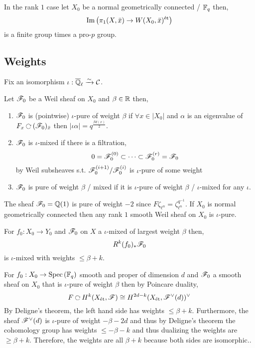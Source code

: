 \documentclass[12pt]{article}
\begin{document}
\begin{exercise}
In the rank $1$ case let $X_0$ be a normal geometrically connected / $\mathbb{F}_q$ then,
\[ \mathrm{Im}\left( \pi_1(X, \bar{x}) \to W(X_0, \bar{x})^{\text{\'{e}t}} \right) \]
is a finite group times a pro-$p$ group. 
\end{exercise}

\subsection{Weights}

Fix an isomorphism $\iota : \overline{\mathbb{Q}}_\ell \xrightarrow{\sim} \mathcal{C}$. 

\begin{defn}
Let $\mathscr{F}_0$ be a Weil sheaf on $X_0$ and $\beta \in \mathbb{R}$ then,
\begin{enumerate}
\item $\mathscr{F}_0$ is (pointwise) $\iota$-pure of weight $\beta$ if $\forall x \in |X_0|$ and $\alpha$ is an eigenvalue of $F_x \acts (\F_0)_{\bar{x}}$ then $|\iota \alpha| = q^{\frac{\beta d(x)}{2}}$. 
\item $\mathscr{F}_0$ is $\iota$-mixed if there is a filtration,
\[ 0 = \mathscr{F}_0^{(0)} \subset \cdots \subset \mathscr{F}_0^{(r)} = \mathscr{F}_0 \]
by Weil subsheaves s.t. $\mathscr{F}_0^{(i+1)} / \mathscr{F}_0^{(i)}$ is $\iota$-pure of some weight
\item $\mathscr{F}_0$ is pure of weight $\beta$ / mixed if it is $\iota$-pure of weight $\beta$ / $\iota$-mixed for any $\iota$.
\end{enumerate}
\end{defn}

\begin{example}
The sheaf $\mathscr{F}_0 = \mathbb{Q}(1)$ is pure of weight $-2$ since $F \zeta_{\ell^n} = \zeta_{\ell^n}^{q^{-1}}$. If $X_0$ is normal geometrically connected then any rank $1$ smooth Weil sheaf on $X_0$ is $\iota$-pure.
\end{example}

\begin{thm}[Deligne]
For $f_0 : X_0 \to Y_0$ and $\mathscr{F}_0$ on $X$ a $\iota$-mixed of largest weight $\beta$ then,
\[ R^k (f_0)_* \mathscr{F}_0 \]
is $\iota$-mixed with weights $\le \beta + k$. 
\end{thm}

\begin{example}
For $f_0 : X_0 \to \mathrm{Spec}\left( \mathbb{F}_q \right)$ smooth and proper of dimension $d$ and $\mathscr{F}_0$ a smooth sheaf on $X_0$ that is $\iota$-pure of weight $\beta$ then by Poincare duality,
\[ F \acts H^k(X_{\et}, \F) \cong H^{2d - k}(X_{\et}, \F^\vee(d))^\vee \]
By Deligne's theorem, the left hand side has weights $\le \beta + k$. Furthermore, the sheaf $\mathscr{F}^\vee(d)$ is $\iota$-pure of weight $-\beta - 2d$ and thus by Deligne's theorem the cohomology group has weights $\le - \beta - k$ and thus dualizing the weights are $\ge \beta + k$. Therefore, the weights are all $\beta + k$ because both sides are isomorphic..
\end{example}
\end{document}
